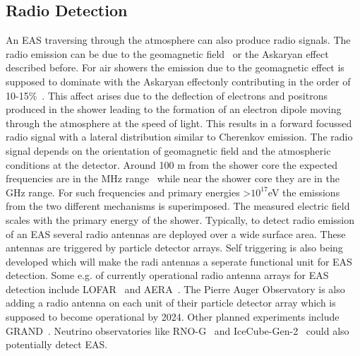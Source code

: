 \subsection*{Radio Detection}
\label{sec:EAS_cher}
An EAS traversing through the atmosphere can also produce radio signals. The radio emission can be due to the geomagnetic field~\cite{} or the Askaryan effect~\cite{} described before. For air showers the emission due to the geomagnetic effect is supposed to dominate with the Askaryan effectonly contributing in the order of 10-15\%~\cite{}. This affect arises due to the deflection of electrons and positrons produced in the shower leading to the formation of an electron dipole moving through the atmosphere at the speed of light. This results in a forward focussed radio signal with a lateral distribution similar to Cherenkov emission. The radio signal depends on the orientation of geomagnetic field and the atmospheric conditions at the detector. Around 100 m from the shower core the expected frequencies are in the MHz range~\cite{} while near the shower core they are in the GHz range. For such frequencies and primary energies >$10^{17}$eV the emissions from the two different mechanisms is superimposed. The measured electric field scales with the primary energy of the shower.  Typically, to detect radio emission of an EAS several radio antennas are deployed over a wide surface area. These antennas are triggered by particle detector arrays. Self triggering is also being developed which will make the radi antennas a seperate functional unit for EAS detection. Some e.g. of currently operational radio antenna arrays for EAS detection include LOFAR~\cite{} and AERA~\cite{}. The Pierre Auger Observatory is also adding a radio antenna on each unit of their particle detector array which is supposed to become operational by 2024. Other planned experiments include GRAND~\cite{}. Neutrino observatories like RNO-G~\cite{} and IceCube-Gen-2~\cite{} could also potentially detect EAS.  

